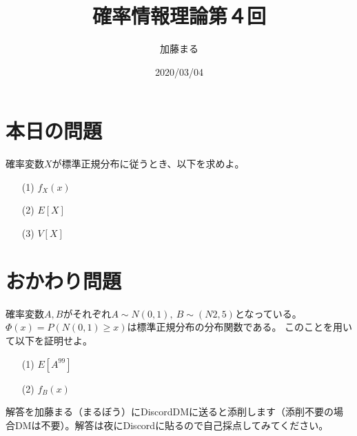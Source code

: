 \documentclass[a4j,uplatex]{jsarticle}
\title{確率情報理論第４回}
\author{加藤まる}
\date{2020/03/04}
\begin{document}
\maketitle

\section*{本日の問題}
確率変数$X$が標準正規分布に従うとき、以下を求めよ。
\begin{itemize}
  \item[(1)] $f_X(x)$
  \item[(2)] $E[X]$
  \item[(3)] $V[X]$
\end{itemize}


\section*{おかわり問題}
確率変数$A,B$がそれぞれ$A\sim N(0,1),~B\sim (N2,5)$となっている。$\Phi (x)=P(N(0,1)\ge x)$は標準正規分布の分布関数である。
このことを用いて以下を証明せよ。
\begin{itemize}
  \item[(1)] $E[A^{99}]$ 
  \item[(2)] $f_B(x)$
\end{itemize}



解答を加藤まる（まるぼう）にDiscordDMに送ると添削します（添削不要の場合DMは不要）。解答は夜にDiscordに貼るので自己採点してみてください。
\end{document}
